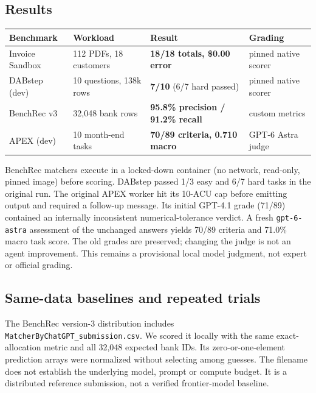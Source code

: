 \documentclass[11pt]{article}
\begin{document}
\subsection{Results}

\begin{table}[h]
\centering\small
\begin{tabular}{@{}llll@{}}
\toprule
\textbf{Benchmark} & \textbf{Workload} & \textbf{Result} & \textbf{Grading} \\
\midrule
Invoice Sandbox & 112 PDFs, 18 customers & \textbf{18/18 totals, \$0.00 error} & pinned native scorer \\
DABstep (dev) & 10 questions, 138k rows & \textbf{7/10} (6/7 hard passed) & pinned native scorer \\
BenchRec v3 & 32,048 bank rows & \textbf{95.8\% precision / 91.2\% recall} & custom metrics \\
APEX (dev) & 10 month-end tasks & \textbf{70/89 criteria, 0.710 macro} & GPT-6 Astra judge \\
\bottomrule
\end{tabular}
\end{table}

\noindent BenchRec matchers execute in a locked-down container (no network, read-only, pinned image) before scoring. DABstep passed 1/3 easy and 6/7 hard tasks in the original run. The original APEX worker hit its 10-ACU cap before emitting output and required a follow-up message. Its initial GPT-4.1 grade (71/89) contained an internally inconsistent numerical-tolerance verdict. A fresh \texttt{gpt-6-astra} assessment of the unchanged answers yields 70/89 criteria and 71.0\% macro task score. The old grades are preserved; changing the judge is not an agent improvement. This remains a provisional local model judgment, not expert or official grading.

\subsection{Same-data baselines and repeated trials}

The BenchRec version-3 distribution includes \texttt{MatcherByChatGPT\_submission.csv}. We scored it locally with the same exact-allocation metric and all 32,048 expected bank IDs. Its zero-or-one-element prediction arrays were normalized without selecting among guesses. The filename does not establish the underlying model, prompt or compute budget. It is a distributed reference submission, not a verified frontier-model baseline.
\end{document}
